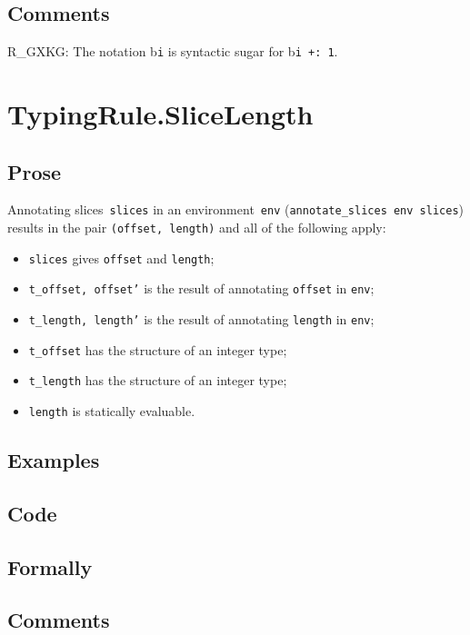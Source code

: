 \documentclass{book}
\begin{document}
  \subsection{Comments}
    R\_GXKG: The notation b\texttt{i} is syntactic sugar for b\texttt{i +: 1}.

\section{TypingRule.SliceLength \label{sec:TypingRule.SliceLength}}

  \subsection{Prose}
   Annotating slices~\texttt{slices} in an environment~\texttt{env}
(\texttt{annotate\_slices env slices}) results in the pair \texttt{(offset,
length)} and all of the following apply:
   \begin{itemize}
   \item \texttt{slices} gives \texttt{offset} and \texttt{length}; 
   \item \texttt{t\_offset, offset'} is the result of annotating \texttt{offset} in \texttt{env};
   \item \texttt{t\_length, length'} is the result of annotating \texttt{length} in \texttt{env};
   \item \texttt{t\_offset} has the structure of an integer type;
   \item \texttt{t\_length} has the structure of an integer type;
   \item \texttt{length} is statically evaluable.
   \end{itemize}

  \subsection{Examples}

  \subsection{Code}

  \subsection{Formally}

  \subsection{Comments}
\end{document}
